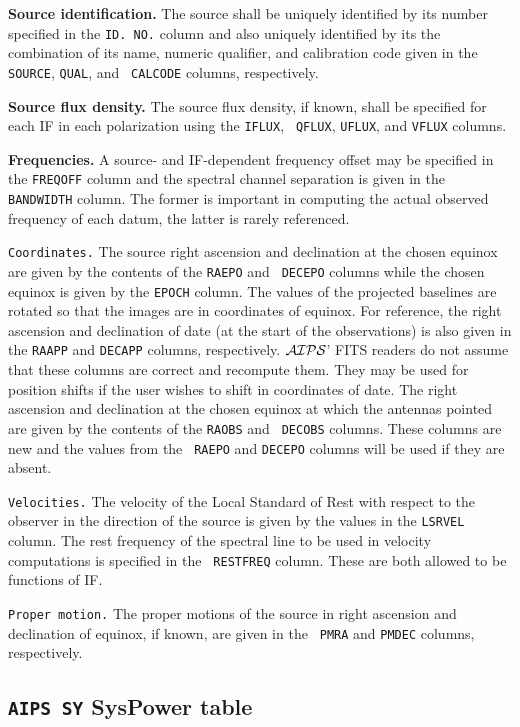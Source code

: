\documentclass[twoside]{article}
\newcommand{\Me}[1]{\textcolor{mecol}{#1}}
\newcommand{\AIPS}{{$\cal AIPS\/$}}
\begin{document}
{\bf Source identification.} The source shall be uniquely identified
by its number specified in the {\tt ID. NO.} column and also uniquely
identified by its the combination of its name, numeric qualifier, and
calibration code given in the {\tt SOURCE}, {\tt QUAL}, and {\tt
  CALCODE} columns, respectively.

{\bf Source flux density.} The source flux density, if known, shall be
specified for each IF in each polarization using the {\tt IFLUX}, {\tt
  QFLUX}, {\tt UFLUX}, and {\tt VFLUX} columns.

{\bf Frequencies.} A source- and IF-dependent frequency offset may be
specified in the {\tt FREQOFF} column and the spectral channel
separation is given in the {\tt BANDWIDTH} column.  The former is
important in computing the actual observed frequency of each datum,
the latter is rarely referenced.

{\tt Coordinates.} The source right ascension and declination at the
chosen equinox are given by the contents of the {\tt RAEPO} and {\tt
  DECEPO} columns while the chosen equinox is given by the {\tt EPOCH}
column.  The values of the projected baselines are rotated so that the
images are in coordinates of equinox.  For reference, the right
ascension and declination of date (at the start of the observations)
is also given in the {\tt RAAPP} and {\tt DECAPP} columns,
respectively.  \AIPS' FITS readers do not assume that these columns
are correct and recompute them.  They may be used for position shifts
if the user wishes to shift in coordinates of date.  \Me{The right
ascension and declination at the chosen equinox at which the antennas
pointed are given by the contents of the {\tt RAOBS} and {\tt
  DECOBS} columns.  These columns are new and the values from the {\tt
  RAEPO} and {\tt DECEPO} columns will be used if they are absent.
\label{rev:SU}}

{\tt Velocities.} The velocity of the Local Standard of Rest with
respect to the observer in the direction of the source is given by the
values in the {\tt LSRVEL} column.  The rest frequency of the spectral
line to be used in velocity computations is specified in the {\tt
  RESTFREQ} column.  These are both allowed to be functions of IF\@.

{\tt Proper motion.} The proper motions of the source in right
ascension and declination of equinox, if known, are given in the {\tt
  PMRA} and {\tt PMDEC} columns, respectively.

\subsection{{\tt AIPS SY} SysPower table}
\label{s:SY}
\end{document}
